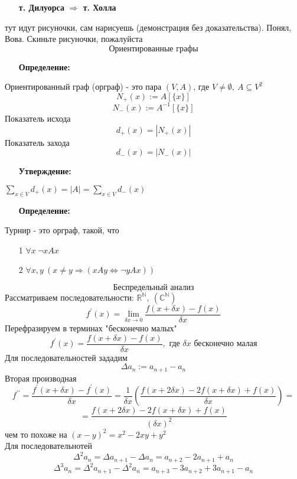 \documentclass[12pt, letterpaper, twoside]{article}
\begin{document}
\begin{enumerate}
    \item[\textbf{т. Дилуорса}] \textbf{$\Rightarrow$ т. Холла}
\end{enumerate}
тут идут рисуночки, сам нарисуешь (демонстрация без доказательства). Понял, Вова. Скиньте рисуночки, пожалуйста
\newpage
\[\textbf{Ориентированные графы}\]
\begin{enumerate}
    \item[\textbf{Определение:}]
\end{enumerate}
Ориентированный граф (орграф) - это пара $(V, A)$, где $V \neq \emptyset,\ A\subseteq V^2$
$$N_+(x) := A[\{ x \}]$$
$$N_-(x) := A^{-1}[\{ x \}]$$
Показатель исхода
$$d_+(x) = |N_+(x)|$$
Показатель захода
$$d_-(x) = |N_-(x)|$$
\begin{enumerate}
    \item[\textbf{Утверждение:}]
\end{enumerate}
$\sum\limits_{x\in V} d_+(x) = |A| = \sum\limits_{x\in V} d_-(x)$
\begin{enumerate}
    \item[\textbf{Определение:}]
\end{enumerate}
Турнир - это орграф, такой, что
\begin{enumerate}
    \item [1] $\forall x\ \neg xAx$
    \item [2] $\forall x, y\ (x\neq y\Rightarrow (xAy\Leftrightarrow \neg yAx) )$
\end{enumerate}
\[\textbf{Беспредельный анализ}\]
Рассматриваем последовательности: $\mathbb{R}^{\mathbb{N}},\ (\mathbb{C}^{\mathbb{N}})$
$$f^{\prime}(x) = \lim_{\delta x\to 0}\dfrac{f(x + \delta x) - f(x)}{\delta x}$$
Перефразируем в терминах "бесконечно малых"
$$f^{\prime}(x) = \dfrac{f(x + \delta x) - f(x)}{\delta x}, \text{ где } \delta x \text{ бесконечно малая}$$
Для последовательностей зададим
$$\Delta a_n := a_{n + 1} - a_n$$
Вторая производная 
$$f^{\prime\prime} = \dfrac{f^{\prime}(x + \delta x) - f^{\prime}(x)}{\delta x} = \dfrac{1}{\delta x}\left( \dfrac{f(x + 2\delta x) - 2f(x + \delta x) + f(x)}{\delta x} \right) = $$
$$ = \dfrac{f(x + 2\delta x) - 2f(x + \delta x) + f(x)}{(\delta x)^2}$$
чем то похоже на $(x - y)^2 = x^2 -2xy + y^2$\\
Для последовательнотей
$$\Delta^2 a_n = \Delta a_{n + 1} - \Delta a_n = a_{n + 2} - 2a_{n + 1} + a_n$$
$$\Delta^3 a_n = \Delta^2 a_{n + 1} - \Delta^2 a_n = a_{n + 3} - 3a_{n + 2} + 3a_{n + 1} - a_n$$
\end{document}
